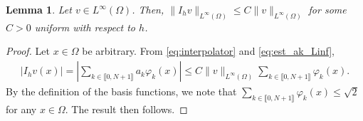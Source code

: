 \documentclass[11 pt]{article}
\newcommand\inter[1]{\llbracket #1\rrbracket}
\newtheorem{lemma}[theorem]{Lemma}
\numberwithin{equation}{section}
\begin{document}
\begin{lemma}\label{lem:inter_l_infty}
    Let $v\in L^\infty(\Omega)$. Then, $\|I_h v\|_{L^\infty(\Omega)}\leq C\|v\|_{L^\infty(\Omega)}$ for some $C>0$ uniform with respect to $h$.
\end{lemma}
%
\begin{proof}
Let $x\in \Omega$ be arbitrary. From \eqref{eq:interpolator} and \eqref{eq:est_ak_Linf},
\begin{align*}
|I_h v(x)|=\left|\sum_{k\in\inter{0,N+1}}a_k \varphi_k(x)\right| \leq C\|v\|_{L^\infty(\Omega)}\sum_{k\in\inter{0,N+1}}\varphi_k(x).
\end{align*}
By the definition of the basis functions, we note that $\sum_{k\in\inter{0,N+1}}\varphi_k(x)\leq \sqrt{2}$ for any $x\in\Omega$. The result then follows.
\end{proof}
\end{document}
